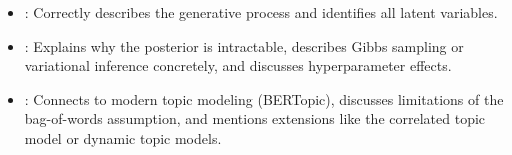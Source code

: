 \begin{interviewq}
\goodgreat
\begin{itemize}
    \item {}: Correctly describes the generative process and
          identifies all latent variables.
    \item {}: Explains why the posterior is intractable, describes
          Gibbs sampling or variational inference concretely, and discusses
          hyperparameter effects.
    \item {}: Connects to modern topic modeling (BERTopic),
          discusses limitations of the bag-of-words assumption, and mentions
          extensions like the correlated topic model or dynamic topic models.
\end{itemize}

\end{interviewq}

\vspace{0.5em}

